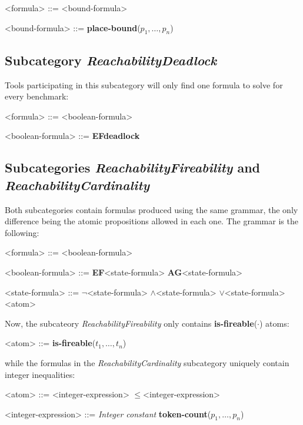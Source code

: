 \documentclass[10pt,english,a4paper]{article}
\newcommand\ctla             {\textbf{A}\xspace}
\newcommand\ctle             {\textbf{E}\xspace}
\newcommand\ltlf             {\textbf{F}\xspace}
\newcommand\ltlg             {\textbf{G}\xspace}
\newcommand\logicnot         {\boldmath$\lnot$\xspace}
\newcommand\logicand         {\boldmath$\land$\xspace}
\newcommand\logicor          {\boldmath$\lor$\xspace}
\newcommand\atomleq          {\boldmath$\leq$\xspace}
\newcommand\atomdead         {\textbf{deadlock}\xspace}
\newcommand\atomisfire[1]    {\textbf{is-fireable}(#1)}
\newcommand\atomplacebnd[1]  {\textbf{place-bound}(#1)}
\newcommand\atomtokenscnt[1] {\textbf{token-count}(#1)}
\begin{document}
\begin{grammar}
<formula> ::= <bound-formula>

<bound-formula> ::= \atomplacebnd{$p_1, \ldots, p_n$}
\end{grammar}


\subsection{Subcategory \textit{ReachabilityDeadlock}}

Tools participating in this subcategory will only find one formula to solve
for every benchmark:

\begin{grammar}

<formula> ::= <boolean-formula>

<boolean-formula> ::= \ctle \ltlf \atomdead

\end{grammar}

\subsection{Subcategories \textit{ReachabilityFireability} and \textit{ReachabilityCardinality}}

Both subcategories contain formulas produced using the same grammar, the
only difference being the atomic propositions allowed in each one.
The grammar is the following:

\begin{grammar}
<formula> ::= <boolean-formula>

<boolean-formula> ::= \ctle \ltlf <state-formula>
\alt \ctla \ltlg <state-formula>

<state-formula> ::=  \logicnot  <state-formula>
 \logicand <state-formula>
 \logicor  <state-formula>
\alt <atom>
\end{grammar}

Now, the subcateory \emph{ReachabilityFireability} only contains
\atomisfire{$\cdot$} atoms:

\begin{grammar}
<atom> ::= \atomisfire{$t_1, \ldots, t_n$}
\end{grammar}

while the formulas in the \emph{ReachabilityCardinality} subcategory
uniquely contain integer inequalities:

\begin{grammar}
<atom> ::= <integer-expression> \atomleq <integer-expression>

<integer-expression> ::= \textit{Integer constant}
\alt \atomtokenscnt{$p_1, \ldots, p_n$}
\end{grammar}
\end{document}
